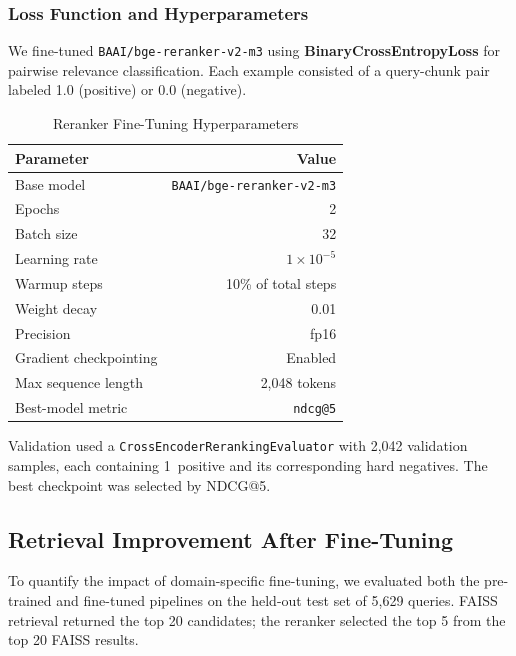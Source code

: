 \documentclass[10pt, letterpaper]{article}
\begin{document}
\subsubsection{Loss Function and Hyperparameters}

We fine-tuned \texttt{BAAI/bge-reranker-v2-m3} using \textbf{BinaryCrossEntropyLoss}
for pairwise relevance classification. Each example consisted of a query-chunk pair
labeled 1.0 (positive) or 0.0 (negative).

\begin{table}[h]
\centering
\caption{Reranker Fine-Tuning Hyperparameters}
\label{tab:reranker-hp}
\begin{tabular}{@{}lr@{}}
\toprule
\textbf{Parameter} & \textbf{Value} \\
\midrule
Base model              & \texttt{BAAI/bge-reranker-v2-m3} \\
Epochs                  & 2 \\
Batch size              & 32 \\
Learning rate           & $1 \times 10^{-5}$ \\
Warmup steps            & 10\% of total steps \\
Weight decay            & 0.01 \\
Precision               & fp16 \\
Gradient checkpointing  & Enabled \\
Max sequence length     & 2,048 tokens \\
Best-model metric       & \texttt{ndcg@5} \\
\bottomrule
\end{tabular}
\end{table}

Validation used a \texttt{CrossEncoderRerankingEvaluator} with 2,042 validation samples,
each containing 1~positive and its corresponding hard negatives. The best checkpoint was
selected by NDCG@5.

\subsection{Retrieval Improvement After Fine-Tuning}

To quantify the impact of domain-specific fine-tuning, we evaluated both the pre-trained
and fine-tuned pipelines on the held-out test set of 5,629 queries. FAISS retrieval
returned the top 20 candidates; the reranker selected the top 5 from the top 20 FAISS
results.
\end{document}
